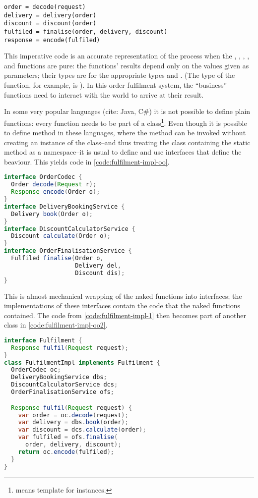 \begin{lstlisting}[caption={Fulfilment implementation I}, label={code:fulfilment-impl-1}, language=Pseudo, escapechar=|]
order = decode(request)
delivery = delivery(order)
discount = discount(order)
fulfiled = finalise(order, delivery, discount)
response = encode(fulfiled)
\end{lstlisting}

This imperative code is an accurate representation of the process when the , , , , and  functions are pure: the functions' results depend only on the values given as parameters; their types are  for the appropriate types  and . (The type of the  function, for example, is ). In this order fulfilment system, the ``business'' functions need to interact with the world to arrive at their result. 

In some very popular languages (cite: Java, C\#) it is not possible to define plain functions: every function needs to be part of a class\footnote{ means template for instances.}. Even though it is possible to define  method in these languages, where the method can be invoked without creating an instance of the class--and thus treating the class containing the static method as a namespace--it is usual to define and use interfaces that define the beaviour\cite{prospring}. This yields code in \autoref{code:fulfilment-impl-oo}.

\begin{lstlisting}[caption={Fulfilment OO implementation I}, label={code:fulfilment-impl-oo}, language=Java, escapechar=|]
interface OrderCodec {
  Order decode(Request r);
  Response encode(Order o);
}
interface DeliveryBookingService {
  Delivery book(Order o);
}
interface DiscountCalculatorService {
  Discount calculate(Order o);
}
interface OrderFinalisationService {
  Fulfiled finalise(Order o, 
                    Delivery del, 
                    Discount dis);
}
\end{lstlisting}

This is almost mechanical wrapping of the naked functions into interfaces; the implementations of these interfaces contain the code that the naked functions contained. The code from \autoref{code:fulfilment-impl-1} then becomes part of another class in \autoref{code:fulfilment-impl-oo2}.

\begin{lstlisting}[caption={Fulfilment OO implementation II}, label={code:fulfilment-impl-oo2}, language=Java, escapechar=|]
interface Fulfilment {
  Response fulfil(Request request);
}
class FulfilmentImpl implements Fulfilment {
  OrderCodec oc;
  DeliveryBookingService dbs;
  DiscountCalculatorService dcs;
  OrderFinalisationService ofs;

  Response fulfil(Request request) {
    var order = oc.decode(request);
    var delivery = dbs.book(order);
    var discount = dcs.calculate(order);
    var fulfiled = ofs.finalise(
      order, delivery, discount);
    return oc.encode(fulfiled);
  }
}
\end{lstlisting}

